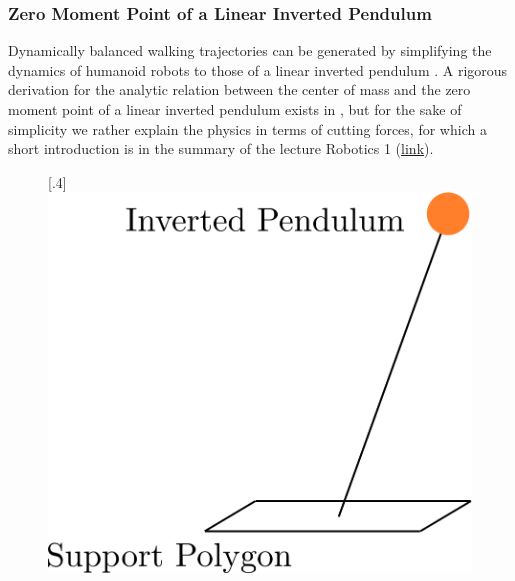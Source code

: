 \subsubsection{Zero Moment Point of a Linear Inverted Pendulum}
Dynamically balanced walking trajectories can be generated by simplifying the dynamics of humanoid robots to those of a linear inverted pendulum \cite{kajita2003biped}. A rigorous derivation for the analytic relation between the center of mass and the zero moment point of a linear inverted pendulum exists in \cite{kajita2014introduction}, but for the sake of simplicity we rather explain the physics in terms of cutting forces, for which a short introduction is in the summary of the lecture Robotics 1 (\href{https://drive.google.com/file/d/1aN1ujXTOlHzO2kLPK7TQRkWfdY-pGzUF/view}{\underline{link}}). 
\begin{figure}[h!]
	\centering
	\subcaptionbox{}%
	[.4\linewidth]{\includegraphics[scale=.3]{chapters/02_background/img/inverted_pendulum.png}}
	\subcaptionbox{}%

\end{figure}
